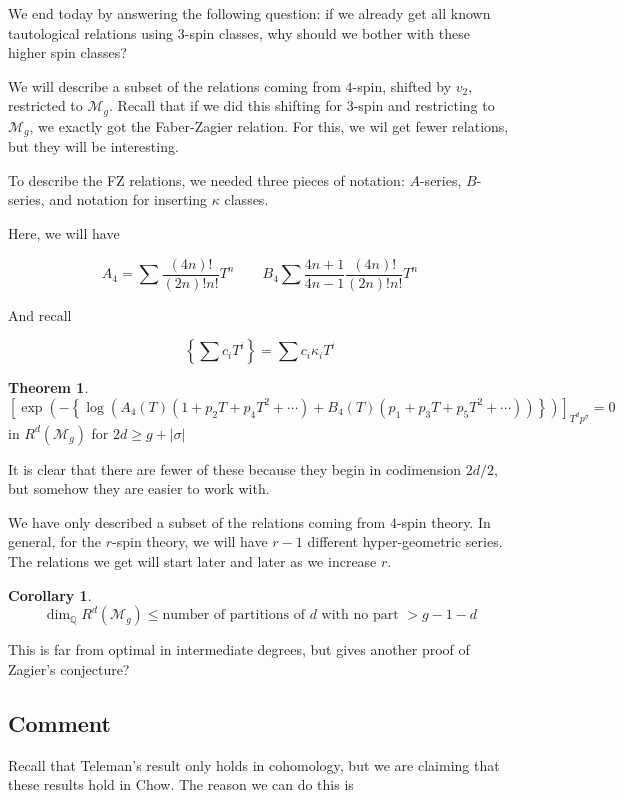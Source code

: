 \documentclass{amsart}
\theoremstyle{definition}
\newtheorem{theorem}{Theorem}
\newtheorem{corollary}{Corollary}
\newcommand{\M}{\mathcal{M}}
\newcommand{\Q}{\mathbb{Q}}
\begin{document}
We end today by answering the following question: if we already get all known tautological relations using $3$-spin classes, why should we bother with these higher spin classes?

We will describe a subset of the relations coming from $4$-spin, shifted by $v_2$, restricted to $\M_g$.  Recall that if we did this shifting for $3$-spin and restricting to $\M_g$, we exactly got the Faber-Zagier relation.  For this, we wil get fewer relations, but they will be interesting.

To describe the FZ relations, we needed three pieces of notation: $A$-series, $B$-series, and notation for inserting $\kappa$ classes.

Here, we will have

$$A_4=\sum \frac{(4n)!}{(2n)!n!} T^n \quad\quad B_4\sum \frac{4n+1}{4n-1} \frac{(4n)!}{(2n)!n!} T^n $$

And recall

$$\left\{\sum c_i T^i\right\}=\sum c_i\kappa_i T^i$$

\begin{theorem}

$$
\left[\exp\left(-\left\{\log\left(A_4(T)(1+p_2T+p_4T^2+\cdots)
+ B_4(T)(p_1+p_3T+p_5T^2+\cdots)\right)\right\}\right)\right]_{T^dp^\sigma}=0
$$
in $R^d(\M_g)$ for $2d\geq g+|\sigma|$
\end{theorem}

It is clear that there are fewer of these because they begin in codimension $2d/2$, but somehow they are easier to work with.

We have only described a subset of the relations coming from $4$-spin theory.  In general, for the $r$-spin theory, we will have $r-1$ different hyper-geometric series.  The relations we get will start later and later as we increase $r$.




\begin{corollary}
$$\dim_\Q R^d(\M_g)\leq \text{number of partitions of $d$ with no part $>g-1-d$}$$
\end{corollary}
This is far from optimal in intermediate degrees, but gives another proof of Zagier's conjecture?

\subsection{Comment}

Recall that Teleman's result only holds in cohomology, but we are claiming that these results hold in Chow.  The reason we can do this is
\end{document}
